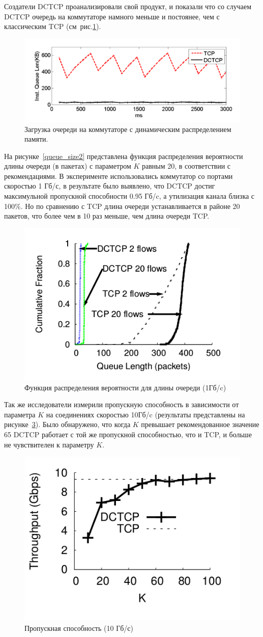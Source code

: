 \documentclass[14pt, a4paper,oneside]{extarticle}
\begin{document}
Создатели DCTCP проанализировали свой продукт, и показали что со случаем DCTCP очередь на коммутаторе намного меньше и постоянее, чем с классическим TCP (см~рис.\ref{queue_size}). 
\begin{figure}
	\includegraphics[width=\linewidth]{queue_size}
	\caption{Загрузка очереди на коммутаторе с динамическим распределением памяти.}
	\label{queue_size}
\end{figure}
На рисунке~\ref{queue_size2} представлена функция распределения вероятности длины очереди (в пакетах) с параметром $K$ равным 20, в соответствии с рекомендациями. В эксперименте использовались коммутатор со портами скоростью 1 Гб/с, в результате было выявлено, что DCTCP достиг максимульной пропускной способности 0.95 Гб/c, а утилизация канала близка с 100\%. Но по сравнению с TCP длина очереди устанавливается в районе 20 пакетов, что более чем в 10 раз меньше, чем длина очереди TCP.
\begin{figure}
	\includegraphics[width=0.5\linewidth]{queue_size2}
	\caption{Функция распределения вероятности для длины очереди (1Гб/c)}
	\label{queueu_size2}
\end{figure}

Так же исследователи измерили пропускную способность в зависимости от параметра $K$ на соединениях скоростью 10Гб/c (результаты представлены на рисунке~\ref{throughput}). Было обнаружено, что когда $K$ превышает рекомендованное значение 65 DCTCP работает с той же пропускной способностью, что и TCP, и больше не чувствителен к параметру $K$.
\begin{figure}
	\includegraphics[width=0.5\linewidth]{throughput}
	\caption{Пропускная способность (10 Гб/с)}
	\label{throughput}
\end{figure}
\end{document}
